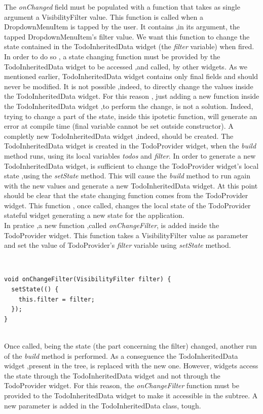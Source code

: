 The \textit{onChanged  }field must be populated with a function that takes as single argument a VisibilityFilter value. This function is called when a DropdownMenuItem is tapped by the user. It contains ,in its argument, the tapped DropdownMenuItem's filter value.  We want this function to change the state contained in the TodoInheritedData widget (the \textit{filter} variable) when fired. In order to do so , a state changing function must be provided by the TodoInheritedData widget to be accessed ,and called, by other widgets. As we mentioned earlier, TodoInheritedData widget contains only final fields and should never be modified. It is not possible ,indeed, to directly change the values inside the TodoInheritedData widget. For this reason , just adding a new function inside the TodoInheritedData widget ,to perform the change, is not a solution. Indeed, trying to change a part of the state, inside this ipotetic function, will generate an error at compile time (final variable cannot be set outside constructor). A completly new TodoInheritedData widget ,indeed, should be created. The TodoInheritedData widget is created in the TodoProvider widget, when the \textit{build} method runs, using its local variables \textit{todos }and \textit{filter}. In order to generate a new TodoInheritedData widget, is sufficient to change the TodoProvider widget's local state ,using the \textit{setState} method. This will cause the \textit{build} method to run again with the new values and generate a new TodoInheritedData widget. At this point should be clear that the state changing function comes from the TodoProvider widget. This function , once called, changes the local state of the TodoProvider stateful widget generating a new state for the application.\\
In pratice ,a new function ,called \textit{onChangeFilter}, is added inside the TodoProvider widget. This function takes a VisibilityFilter value as parameter and set the  value of TodoProvider's \textit{filter} variable using \textit{setState} method. 

\mbox{}\\

\begin{code}
 \mbox{}

\label{code:2.23}
\begin{verbatim}
void onChangeFilter(VisibilityFilter filter) {
  setState(() {
    this.filter = filter;
  });
}
\end{verbatim}
\end{code}
\mbox{}\\
Once called, being the state (the part concerning the filter) changed, another run of the \textit{build} method is performed. As a conseguence the TodoInheritedData widget ,present in the tree, is replaced with the new one.
However, widgets access the state through the TodoInheritedData widget and not through the TodoProvider widget. For this reason,
the \textit{onChangeFilter   }function must be provided to the TodoInheritedData widget to make it accessible in the subtree. A new parameter is added in the TodoInheritedData class, tough.

